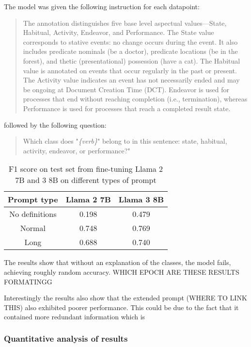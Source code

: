 The model was given the following instruction for each datapoint:
\begin{quotation}
    The annotation distinguishes five base level aspectual values—State, Habitual, Activity, Endeavor, and Performance. The State value corresponds to stative events: no change occurs during the event. It also includes predicate nominals (be a doctor), predicate locations (be in the forest), and thetic (presentational) possession (have a cat). The Habitual value is annotated on events that occur regularly in the past or present. The Activity value indicates an event has not necessarily ended and may be ongoing at Document Creation Time (DCT). Endeavor is used for processes that end without reaching completion (i.e., termination), whereas Performance is used for processes that reach a completed result state. 
\end{quotation}
followed by the following question:
\begin{quotation}
    Which class does "\emph{\{verb\}}" belong to in this sentence: state, habitual, activity, endeavor, or performance?"
\end{quotation}

\begin{table}
    \centering
    \begin{tabular}{|c|c|c|}\hline
        \textbf{Prompt type} & \textbf{Llama 2 7B} & \textbf{Llama 3 8B} \\ \hline
        No definitions & 0.198 & 0.479 \\ \hline
        Normal  & 0.748 & 0.769 \\\hline
        Long & 0.688 & 0.740  \\ \hline
    \end{tabular}
    \caption{F1 score on test set from fine-tuning Llama 2 7B and 3 8B on different types of prompt}
\end{table}

The results show that without an explanation of the classes, the model fails, achieving roughly random accuracy. WHICH EPOCH ARE THESE RESULTS FORMATINGG

Interestingly the results also show that the extended prompt (WHERE TO LINK THIS) also exhibited poorer performance. This could be due to the fact that it contained more redundant information which is 

\subsubsection*{Quantitative analysis of results}

